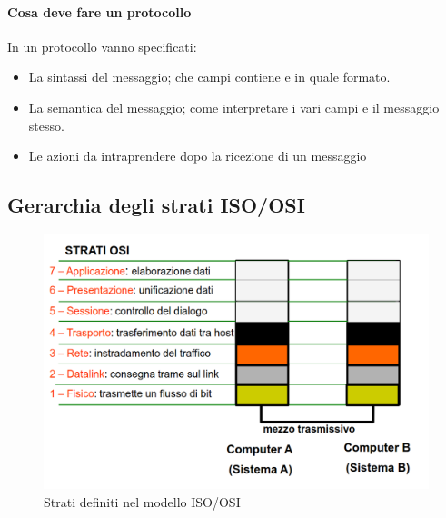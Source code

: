 \paragraph{Cosa deve fare un protocollo} In un protocollo vanno specificati:
\begin{itemize}
    \item La sintassi del messaggio; che campi contiene e in quale formato.
    \item La semantica del messaggio; come interpretare i vari campi e il messaggio stesso.
    \item Le azioni da intraprendere dopo la ricezione di un messaggio
\end{itemize}

\newpage

\subsection{Gerarchia degli strati ISO/OSI}
\begin{figure}[h]
    \centering
    \includegraphics[scale=0.34]{Immagini/Strati_modello_ISO-OSI.png}
    \caption{Strati definiti nel modello ISO/OSI}
\end{figure}
